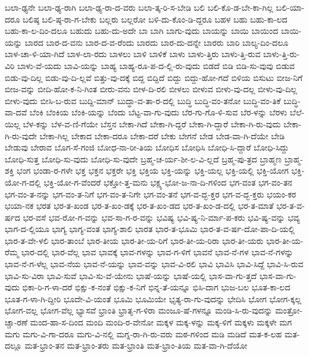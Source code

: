 {ಬಲಾ-ಢ್ಯನೇ
ಬಲಾ-ಢ್ಯ-ರಾಗಿ
ಬಲಾ-ಢ್ಯ-ರಾ-ದ-ವರು
ಬಲಾ-ತ್ಕ-ರಿ-ಸ-ಬೇಡಿ
ಬಲಿ
ಬಲಿ-ಕೊ-ಡ-ಬೇ-ಕಾ-ಗಿಲ್ಲ
ಬಲಿ-ಯಾ-ದರೂ
ಬಲಿಷ್ಠ
ಬಲಿ-ಷ್ಠ-ರಾ-ಗ-ಬೇಕು
ಬಲ್ಲರು
ಬಲ್ಲರೋ
ಬಳಿ-ದು-ಕೊಂ-ಡಿ-ದ್ದರೂ
ಬಹಳ
ಬಹು
ಬಹು-ಕಾ-ಲದ
ಬಹು-ಕಾ-ಲ-ದಿಂ-ದಲೂ
ಬಹುದು
ಬಹು-ದು-ಅದೇ
ಬಾ
ಬಾಗಿ
ಬಾಗು-ವುದು
ಬಾಯನ್ನು
ಬಾಯಿ
ಬಾಯಿಂದ
ಬಾಯಿ-ಯನ್ನು
ಬಾರದ
ಬಾರ-ದ-ವನು
ಬಾರ-ದ-ವ-ರೆಂದು
ಬಾರದು
ಬಾರ-ದು-ದನ್ನೇ
ಬಾರರು
ಬಾರಿ
ಬಾಲ್ಯ-ದಿಂ-ದಲೂ
ಬಾಳ-ಚಾ-ಳಿ-ಯಾ-ಗಿದೆ
ಬಾಳ-ಲಾ-ರದು
ಬಾಳಲು
ಬಾಳಿ
ಬಾಳಿಕೆ
ಬಾಳು
ಬಾಳು-ತ್ತಿರು
ಬಾಳು-ತ್ತಿ-ರುವ
ಬಾಳು-ತ್ತಿ-ರು-ವಿರಿ
ಬಾಳು-ವೆ-ಯದು
ಬಾವಿ-ಯನ್ನು
ಬಾಹ್ಯ
ಬಾಹ್ಯ-ರೂ-ಪ-ದ-ಲ್ಲಿ-ರು-ವುದು
ಬಿಡದೆ
ಬಿಡಿ
ಬಿಡಿ-ಸು-ವುವು
ಬಿಡುವ
ಬಿಡು-ವು-ದಿಲ್ಲ
ಬಿಡು-ವು-ದಿ-ಲ್ಲವೆ
ಬಿತ್ತು-ವು-ದಕ್ಕೆ
ಬಿದ್ದ
ಬಿದ್ದಿದೆ
ಬಿದ್ದು
ಬಿದ್ದು-ಹೋ-ಗದೆ
ಬಿಳಿಯ
ಬಿಸುಟು
ಬೀಜ-ನಿಗೆ
ಬೀಜ-ವನ್ನು
ಬೀದಿ-ಹೋ-ಕ-ನಿ-ಗಿಂತ
ಬೀರು-ವನು
ಬೀಳ-ದಿ-ರಲಿ
ಬೀಳಲು
ಬೀಳುವ
ಬೀಳು-ವು-ದಲ್ಲ
ಬೀಳು-ವು-ದಿಲ್ಲ
ಬೀಳು-ವುದು
ಬೀಸಿ-ಬ-ರುವ
ಬುದ್ದಿ-ಮಾನ್
ಬುದ್ಧಾ-ವ-ತಾ-ರ-ದಲ್ಲಿ
ಬುದ್ಧಿ
ಬುದ್ಧಿ-ವಂ-ತನೋ
ಬುದ್ಧಿ-ವಂ-ತಿಕೆ
ಬುದ್ಧಿ-ವಾ-ದವೆ
ಬೆಂಕಿ
ಬೆಂಕಿಯ
ಬೆಂಕಿ-ಯನ್ನು
ಬೆಂದು
ಬೆಟ್ಟ-ವಾ-ಗು-ವುದು
ಬೆರ-ಗು-ಗೊ-ಳಿ-ಸುವ
ಬೆರ-ಳನ್ನು
ಬೆರಳು
ಬೆಲೆ-ಯಿಲ್ಲ
ಬೆಳ-ಕನ್ನು
ಬೆಳ-ವ-ಣಿ-ಗೆಯೇ
ಬೆಸ್ತನ
ಬೇಕಾ-ಗಿದೆ
ಬೇಕಾ-ಗಿ-ದ್ದರೆ
ಬೇಕಾ-ಗಿ-ದ್ದಾರೆ
ಬೇಕಾ-ಗಿ-ರು-ವುದು
ಬೇಕಾ-ಗಿ-ರು-ವುದೇ
ಬೇಕಾ-ಗಿಲ್ಲ
ಬೇಕಾದ
ಬೇಕಾ-ದರೂ
ಬೇಕಾ-ದರೆ
ಬೇಕು
ಬೇಗನೆ
ಬೇಡ
ಬೇಡ-ವಾ-ಗಿ-ದೆಯೇ
ಬೇಡಿ
ಬೇಡುವು
ಬೇರಾವ
ಬೊಗ-ಸೆ-ಗಂಜಿ
ಬೋಧ-ನಾ-ರೀ-ತಿಯ
ಬೋಧಿಸ
ಬೋಧಿಸಿ
ಬೋಧಿ-ಸಿ-ದ್ದಾರೆ
ಬೋಧಿ-ಸಿದ್ದು
ಬೋಧಿ-ಸುತ್ತ
ಬೋಧಿ-ಸು-ವುದು
ಬೋಧಿ-ಸು-ವುದೇ
ಬ್ರಹ್ಮ-ಚ-ರ್ಯ-ಶೀ-ಲ-ವಿ-ಲ್ಲದೆ
ಬ್ರಹ್ಮ-ಪು-ತ್ರದ
ಬ್ರಾಹ್ಮಣ
ಬ್ರಾಹ್ಮ-ಶಕ್ತಿ
ಭಂಗ
ಭಂಡಾ-ರ-ಗಳೇ
ಭಕ್ತ
ಭಕ್ತನ
ಭಕ್ತರೇ
ಭಕ್ತಿ
ಭಕ್ತಿಯ
ಭಕ್ತಿ-ಯನ್ನು
ಭಕ್ತಿ-ಯಲ್ಲ
ಭಕ್ತಿ-ಯಲ್ಲಿ
ಭಕ್ತಿ-ಯೋಗ
ಭಕ್ತಿ-ಯೋ-ಗ-ದಲ್ಲಿ
ಭಕ್ತಿ-ಯೋ-ಗ-ವೆಂದರೆ
ಭಕ್ತೋ-ತ್ತ-ಮನು
ಭಕ್ಷ್ಯ-ಭೋ-ಜ-ನಾ-ದಿ-ಗಳಿಂದ
ಭಗ-ವಂತ
ಭಗ-ವಂ-ತನ
ಭಗ-ವಂ-ತ-ನನ್ನು
ಭಗ-ವಂ-ತ-ನಿಗೆ
ಭಗ-ವಂ-ತ-ನಿಗೇ
ಭಗ-ವಂ-ತನೆ
ಭಗ-ವ-ದ್ಭ-ಕ್ತರ
ಭಗ-ವ-ದ್ಭ-ಕ್ತರು
ಭಯಂ-ಕರ
ಭಯಾ-ನಕ
ಭರತ
ಭರ-ತ-ಖಂಡ
ಭರ-ತ-ಖಂ-ಡಕ್ಕೆ
ಭರ-ತ-ಖಂ-ಡದ
ಭರ-ತ-ಖಂ-ಡ-ದಲ್ಲಿ
ಭರ-ತ-ಮಾತೆ
ಭರ-ತ-ವ-ರ್ಷದ
ಭರ-ವಸೆ
ಭವ-ರೋ-ಗ-ವನ್ನು
ಭವ-ಸಾ-ಗ-ರ-ವನ್ನು
ಭವಿಷ್ಯ
ಭವಿ-ಷ್ಯ-ನಿ-ರ್ಮಾ-ಪ-ಕರು
ಭವಿ-ಷ್ಯ-ವನ್ನು
ಭವ್ಯ
ಭಾಗ-ದ-ಲ್ಲಿಯೂ
ಭಾಗ್ಯ
ಭಾಗ್ಯ-ವಂತ
ಭಾಗ್ಯ-ಶಾಲಿ
ಭಾರತ
ಭಾರ-ತ-ಭೂಮಿ
ಭಾರ-ತ-ವ-ರ್ಷ-ದೋ-ಪಾ-ದಿ-ಯಲ್ಲಿ
ಭಾರ-ತ-ವೇ-ಳಲಿ
ಭಾರ-ತಾಂಬೆ
ಭಾರ-ತೀಯ
ಭಾರ-ತೀ-ಯ-ರಿಗೆ
ಭಾರ-ತೀ-ಯ-ರಿರಾ
ಭಾರ-ತೀ-ಯರು
ಭಾರ-ತೀ-ಯ-ರೆಮ್ಮ
ಭಾರ-ದಲ್ಲಿ
ಭಾರ-ವೆಲ್ಲ
ಭಾವ
ಭಾವಕ್ಕೆ
ಭಾವ-ಗಳನ್ನು
ಭಾವ-ಗ-ಳಿಗೆ
ಭಾವನೆ
ಭಾವ-ನೆ-ಗಳ
ಭಾವ-ನೆ-ಗಳನ್ನು
ಭಾವ-ನೆ-ಗ-ಳೆಲ್ಲ
ಭಾವ-ನೆಯ
ಭಾವ-ನೆ-ಯನ್ನು
ಭಾವ-ವನ್ನು
ಭಾವ-ವಿ-ರಲಿ
ಭಾವಿ
ಭಾವಿಸಿ
ಭಾವಿ-ಸಿದ್ದೆ
ಭಾವಿ-ಸಿ-ರುವ
ಭಾವಿ-ಸು-ವಿರಾ
ಭಾವಿ-ಸುವೆ
ಭಾವಿ-ಸು-ವೆ-ಯೇನು
ಭಾಷೆ-ಯನ್ನು
ಭಾಷೆ-ಯಲ್ಲಿ
ಭಾಸ-ವಾ-ಗು-ತ್ತದೆ
ಭಾಸ-ವಾ-ಗು-ವುದು
ಭಿಕಾ-ರಿ-ಗ-ಳಾ-ದರೆ
ಭಿಕ್ಷು-ಕ-ನಂತೆ
ಭಿಕ್ಷು-ಕ-ನಿಗೆ
ಭಿನ್ನ-ತೆ-ಯನ್ನೂ
ಭಿಸಿ-ದಾಗ
ಭುಜ-ಬಲ
ಭೂತ-ಕಾ-ಲದ
ಭೂತ-ಗ-ಳಾ-ಗಿ-ದ್ದೀರಿ
ಭೂದೇ-ವಿ-ಯಂತೆ
ಭೂಮಿ
ಭೂಮಿಯೇ
ಭೃತ್ಯ-ರಾ-ಗು-ವುದನ್ನು
ಭೇದಿಸಿ
ಭೋಗ
ಭೋಗ-ಕ್ಕಲ್ಲ
ಭೋಗ-ವಲ್ಲ
ಭೋಗ-ವೆಲ್ಲ
ಭ್ಯಾಸವೆ
ಭ್ರಾಂತಿ
ಭ್ರಾತೃ-ಗ-ಳಿರಾ
ಮಂಜೂ-ಷೆ-ಗಳನ್ನೂ
ಮಂಡಿ-ಸಿ-ರು-ವುದನ್ನು
ಮಂತ್ರೋ-ಚ್ಚಾ-ರಣೆ
ಮಂದ-ಹಾ-ಸ-ದಿಂದ
ಮಂದಿ
ಮಂದಿ-ರ-ವೇನೋ
ಮಕ್ಕಳ
ಮಕ್ಕ-ಳನ್ನು
ಮಕ್ಕ-ಳಿಗೆ
ಮಕ್ಕಳು
ಮಕ್ಕಳೇ
ಮಗ
ಮಗು
ಮಗು-ವಿ-ಗಾ-ದರೂ
ಮಗು-ವಿ-ನಲ್ಲಿ
ಮಗ್ನ-ರಾ-ಗಿ-ರು-ವರು
ಮಠ-ಗಳಿಂದ
ಮಡಿ
ಮಡಿದೆ
ಮತ-ಕ-ಲಹ
ಮತ-ದಲ್ಲೂ
ಮತ-ಭ್ರಾಂ-ತನ
ಮತ-ಭ್ರಾಂ-ತರು
ಮತ-ಭ್ರಾಂತಿ
ಮತ-ಭ್ರಾಂ-ತಿಯ
ಮತ-ವಾ-ಗಿ-ದೆಯೋ
}
